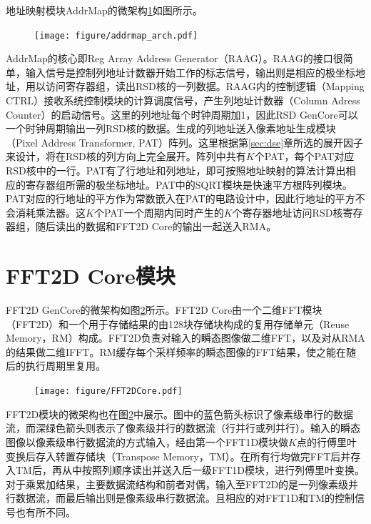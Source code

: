 \documentclass[master]{shtthesis}             %
\begin{document}
地址映射模块{AddrMap}的微架构\ref{fig:addrmap_arch}如图所示。
\begin{figure}[!tb]
  \centering
  \texttt{[image: figure/addrmap\_arch.pdf]}
  \label{fig:addrmap_arch}
\end{figure}
{AddrMap}的核心即{Reg Array Address Generator}（RAAG）。RAAG的接口很简单，输入信号是控制列地址计数器开始工作的标志信号，输出则是相应的极坐标地址，用以访问寄存器组，读出RSD核的一列数据。RAAG内的控制逻辑（Mapping CTRL）接收系统控制模块的计算调度信号，产生列地址计数器（Column Adress Counter）的启动信号。这里的列地址每个时钟周期加1，因此RSD GenCore可以一个时钟周期输出一列RSD核的数据。生成的列地址送入像素地址生成模块（Pixel Address Transformer, PAT）阵列。这里根据第\ref{sec:dse}章所选的展开因子来设计，将在RSD核的列方向上完全展开。阵列中共有$K$个PAT，每个PAT对应RSD核中的一行。PAT有了行地址和列地址，即可按照地址映射的算法计算出相应的寄存器组所需的极坐标地址。PAT中的SQRT模块是快速平方根阵列模块。PAT对应的行地址的平方作为常数嵌入在PAT的电路设计中，因此行地址的平方不会消耗乘法器。这$K$个PAT一个周期内同时产生的$K$个寄存器地址访问RSD核寄存器组，随后读出的数据和FFT2D Core的输出一起送入RMA。

\section{FFT2D Core模块}\label{sec:fft2dcore}

FFT2D GenCore的微架构如图\ref{fig:fft2d_core_uarch}所示。FFT2D Core由一个二维FFT模块（FFT2D）和一个用于存储结果的由128块存储块构成的复用存储单元（Reuse Memory，RM）构成。FFT2D负责对输入的瞬态图像做二维FFT，以及对从RMA的结果做二维IFFT。RM缓存每个采样频率的瞬态图像的FFT结果，使之能在随后的执行周期里复用。%
\begin{figure}[!tb]
  \centering
  \texttt{[image: figure/FFT2DCore.pdf]}
  \label{fig:fft2d_core_uarch}
\end{figure}
FFT2D模块的微架构也在图\ref{fig:fft2d_core_uarch}中展示。图中的蓝色箭头标识了像素级串行的数据流，而深绿色箭头则表示了像素级并行的数据流（行并行或列并行）。输入的瞬态图像以像素级串行数据流的方式输入，经由第一个FFT1D模块做$K$点的行傅里叶变换后存入转置存储块（Transpose Memory，TM）。在所有行均做完FFT后并存入TM后，再从中按照列顺序读出并送入后一级FFT1D模块，进行列傅里叶变换。对于乘累加结果，主要数据流结构和前者对偶，输入至FFT2D的是一列像素级并行数据流，而最后输出则是像素级串行数据流。且相应的对FFT1D和TM的控制信号也有所不同。
\end{document}
